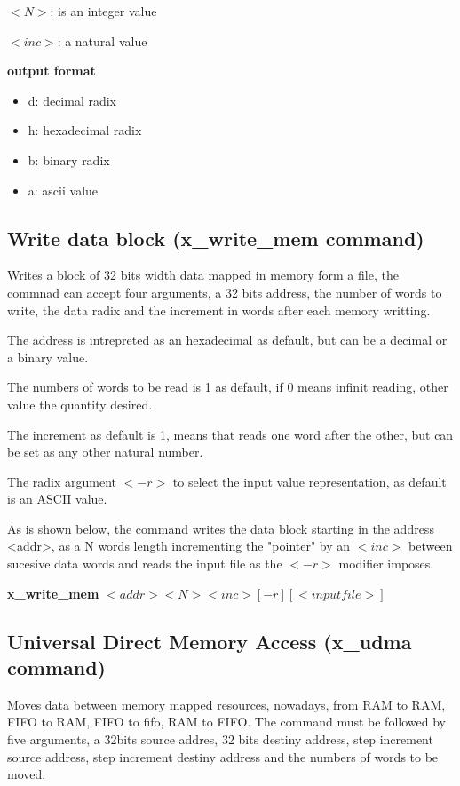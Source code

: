 \documentclass{article}
\begin{document}
\vspace{2mm}
$<N>$: is an integer value
\vspace{2mm}

$<inc>$: a natural value
\vspace{2mm}

\textbf{output format}
\begin{itemize}
    \item d: decimal radix
    \item h: hexadecimal radix
    \item b: binary radix
    \item a: ascii value 
\end{itemize}


\subsection{Write data block (x\_write\_mem command)}
Writes a block of 32 bits width data mapped in memory form a file, the commnad can accept four arguments, a 32 bits address, 
the number of words to write, the data radix and the increment in words after each memory writting.

The address is intrepreted as an hexadecimal as default, but can be a decimal or a binary value.

The numbers of words to be read is 1 as default, if 0 means infinit reading, other value the quantity desired.

The increment as default is 1, means that reads one word after the other, but can be set as any other natural number. 


The radix argument $<-r>$ to select the input value representation, as default is an ASCII value.

As is shown below, the command writes the data block starting in the address <addr>, as a N words length incrementing the 
"pointer" by an $<inc>$ between sucesive data words and reads the input file as the $<-r>$ modifier imposes.

\vspace{5mm}

\textbf{x\_write\_mem} $<addr> <N> <inc> [-r] [<input file>]$

\vspace{5mm}

\subsection{Universal Direct Memory Access (x\_udma command)}
Moves data between memory mapped resources, nowadays, from RAM to RAM, FIFO to RAM, FIFO to fifo, RAM to FIFO. The command 
must be followed by five arguments, a 32bits source addres, 32 bits destiny address, step increment source address, step
increment destiny address and the numbers of words to be moved.
\end{document}
